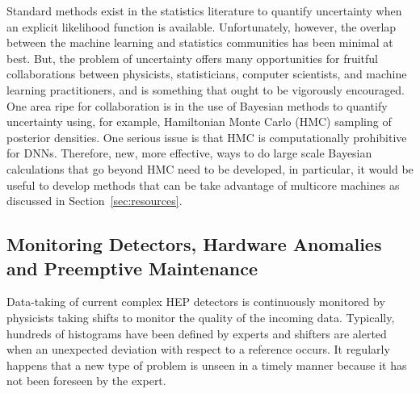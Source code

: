 Standard methods exist in the statistics literature to quantify uncertainty when an explicit likelihood function is available. Unfortunately, however, the overlap between the machine learning and statistics communities has been minimal at best.
But, the problem of uncertainty offers many opportunities for fruitful collaborations between physicists, statisticians, computer scientists, and machine learning practitioners, and is something that ought to be vigorously encouraged.
One area ripe for collaboration is in the use of Bayesian methods to quantify uncertainty using, for example, Hamiltonian Monte Carlo (HMC) sampling of posterior densities. One serious issue is that HMC is computationally prohibitive for DNNs. Therefore, new, more effective, ways to do large scale Bayesian calculations that go beyond HMC need to be developed, in particular, it would be useful to develop methods that can be take advantage of multicore machines as discussed in Section~\ref{sec:resources}.




\subsection{Monitoring Detectors, Hardware Anomalies and Preemptive Maintenance}\label{sec:applications-monitoring}
Data-taking of current complex HEP detectors is continuously monitored by physicists taking shifts to monitor the quality of the incoming data. Typically, hundreds of histograms have been defined by experts and shifters are alerted when an unexpected deviation with respect to a reference occurs. It regularly happens that a new type of problem is unseen in a timely manner because it has not been foreseen by the expert.\\

